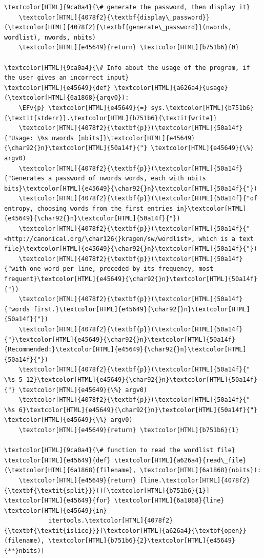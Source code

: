 \documentclass{scrartcl}
\newcommand{\EFv}[1]{\textcolor{EFv}{#1}} %
\begin{document}
\begin{Code}
\begin{Verbatim}[]
    \textcolor[HTML]{9ca0a4}{\# generate the password, then display it}
    \textcolor[HTML]{4078f2}{\textbf{display\_password}}(\textcolor[HTML]{4078f2}{\textbf{generate\_password}}(nwords, wordlist), nwords, nbits)
    \textcolor[HTML]{e45649}{return} \textcolor[HTML]{b751b6}{0}

\textcolor[HTML]{9ca0a4}{\# Info about the usage of the program, if the user gives an incorrect input}
\textcolor[HTML]{e45649}{def} \textcolor[HTML]{a626a4}{usage}(\textcolor[HTML]{6a1868}{argv0}):
    \EFv{p} \textcolor[HTML]{e45649}{=} sys.\textcolor[HTML]{b751b6}{\textit{stderr}}.\textcolor[HTML]{b751b6}{\textit{write}}
    \textcolor[HTML]{4078f2}{\textbf{p}}(\textcolor[HTML]{50a14f}{"Usage: \%s nwords [nbits]}\textcolor[HTML]{e45649}{\char92{}n}\textcolor[HTML]{50a14f}{"} \textcolor[HTML]{e45649}{\%} argv0)
    \textcolor[HTML]{4078f2}{\textbf{p}}(\textcolor[HTML]{50a14f}{"Generates a password of nwords words, each with nbits bits}\textcolor[HTML]{e45649}{\char92{}n}\textcolor[HTML]{50a14f}{"})
    \textcolor[HTML]{4078f2}{\textbf{p}}(\textcolor[HTML]{50a14f}{"of entropy, choosing words from the first entries in}\textcolor[HTML]{e45649}{\char92{}n}\textcolor[HTML]{50a14f}{"})
    \textcolor[HTML]{4078f2}{\textbf{p}}(\textcolor[HTML]{50a14f}{"<http://canonical.org/\char126{}kragen/sw/wordlist>, which is a text file}\textcolor[HTML]{e45649}{\char92{}n}\textcolor[HTML]{50a14f}{"})
    \textcolor[HTML]{4078f2}{\textbf{p}}(\textcolor[HTML]{50a14f}{"with one word per line, preceded by its frequency, most frequent}\textcolor[HTML]{e45649}{\char92{}n}\textcolor[HTML]{50a14f}{"})
    \textcolor[HTML]{4078f2}{\textbf{p}}(\textcolor[HTML]{50a14f}{"words first.}\textcolor[HTML]{e45649}{\char92{}n}\textcolor[HTML]{50a14f}{"})
    \textcolor[HTML]{4078f2}{\textbf{p}}(\textcolor[HTML]{50a14f}{"}\textcolor[HTML]{e45649}{\char92{}n}\textcolor[HTML]{50a14f}{Recommended:}\textcolor[HTML]{e45649}{\char92{}n}\textcolor[HTML]{50a14f}{"})
    \textcolor[HTML]{4078f2}{\textbf{p}}(\textcolor[HTML]{50a14f}{"    \%s 5 12}\textcolor[HTML]{e45649}{\char92{}n}\textcolor[HTML]{50a14f}{"} \textcolor[HTML]{e45649}{\%} argv0)
    \textcolor[HTML]{4078f2}{\textbf{p}}(\textcolor[HTML]{50a14f}{"    \%s 6}\textcolor[HTML]{e45649}{\char92{}n}\textcolor[HTML]{50a14f}{"} \textcolor[HTML]{e45649}{\%} argv0)
    \textcolor[HTML]{e45649}{return} \textcolor[HTML]{b751b6}{1}

\textcolor[HTML]{9ca0a4}{\# function to read the wordlist file}
\textcolor[HTML]{e45649}{def} \textcolor[HTML]{a626a4}{read\_file}(\textcolor[HTML]{6a1868}{filename}, \textcolor[HTML]{6a1868}{nbits}):
    \textcolor[HTML]{e45649}{return} [line.\textcolor[HTML]{4078f2}{\textbf{\textit{split}}}()[\textcolor[HTML]{b751b6}{1}] \textcolor[HTML]{e45649}{for} \textcolor[HTML]{6a1868}{line} \textcolor[HTML]{e45649}{in}
            itertools.\textcolor[HTML]{4078f2}{\textbf{\textit{islice}}}(\textcolor[HTML]{a626a4}{\textbf{open}}(filename), \textcolor[HTML]{b751b6}{2}\textcolor[HTML]{e45649}{**}nbits)]


\end{Verbatim}
\end{Code}
\end{document}
